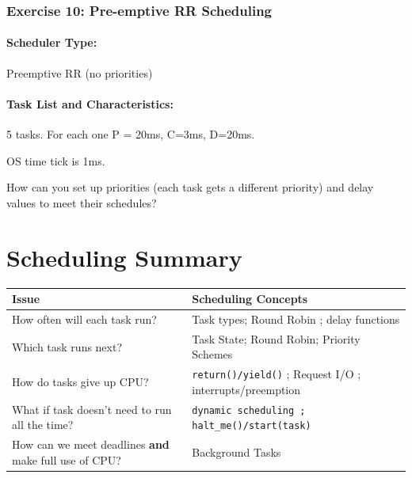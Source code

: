
\subsubsection{Exercise 10: Pre-emptive RR Scheduling}

\paragraph{Scheduler Type:} Preemptive RR (no priorities)
\paragraph{Task List and Characteristics:}  
            \begin{description} 
               \item 5 tasks. For each one P = 20ms, C=3ms, D=20ms. 
  	       \item OS time tick is 1ms.
            \end{description}

How can you set up priorities (each task gets a different priority) and delay values to meet their schedules?
 


\section{Scheduling Summary}


\begin{tabular}{|p{1.75in}|p{1.75in}|}
\hline
Issue                   & Scheduling Concepts    \\ \hline
How often will each task run? & Task types; Round Robin ; delay functions      \\ \hline
Which task runs next?         & Task State; Round Robin; Priority Schemes   \\\hline
How do tasks give up CPU?       & {\tt return()/yield()} ; Request I/O ;
                                       interrupts/preemption\\\hline
What if task doesn't need to run all the time?
                                & {\tt  dynamic scheduling ; halt\_me()/start(task)} \\\hline
How can we meet deadlines {\bf and} make full use of CPU?
                                & Background Tasks \\\hline
\end{tabular}


